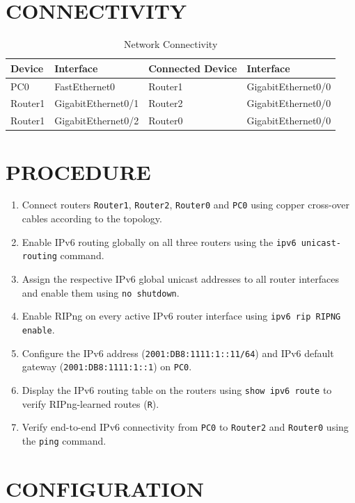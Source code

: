 \documentclass[12pt,a4paper]{article}
\begin{document}
	\section*{CONNECTIVITY}
	\begin{table}[H]
		\centering
		\begin{tabular}{|l|l|l|l|}
			\hline
			\textbf{Device} & \textbf{Interface} & \textbf{Connected Device} & \textbf{Interface} \\ \hline
			PC0     & FastEthernet0      & Router1 & GigabitEthernet0/0 \\ \hline
			Router1 & GigabitEthernet0/1 & Router2 & GigabitEthernet0/0 \\ \hline
			Router1 & GigabitEthernet0/2 & Router0 & GigabitEthernet0/0 \\ \hline
		\end{tabular}
		\caption{Network Connectivity}
	\end{table}
	
	\section*{PROCEDURE}
	\begin{enumerate}
		\item Connect routers \texttt{Router1}, \texttt{Router2}, \texttt{Router0} and \texttt{PC0} using copper cross-over cables according to the topology.
		\item Enable IPv6 routing globally on all three routers using the \texttt{ipv6 unicast-routing} command.
		\item Assign the respective IPv6 global unicast addresses to all router interfaces and enable them using \texttt{no shutdown}.
		\item Enable RIPng on every active IPv6 router interface using \texttt{ipv6 rip RIPNG enable}.
		\item Configure the IPv6 address (\texttt{2001:DB8:1111:1::11/64}) and IPv6 default gateway (\texttt{2001:DB8:1111:1::1}) on \texttt{PC0}.
		\item Display the IPv6 routing table on the routers using \texttt{show ipv6 route} to verify RIPng-learned routes (\texttt{R}).
		\item Verify end-to-end IPv6 connectivity from \texttt{PC0} to \texttt{Router2} and \texttt{Router0} using the \texttt{ping} command.
	\end{enumerate}
	
	\section*{CONFIGURATION}
	
\end{document}
